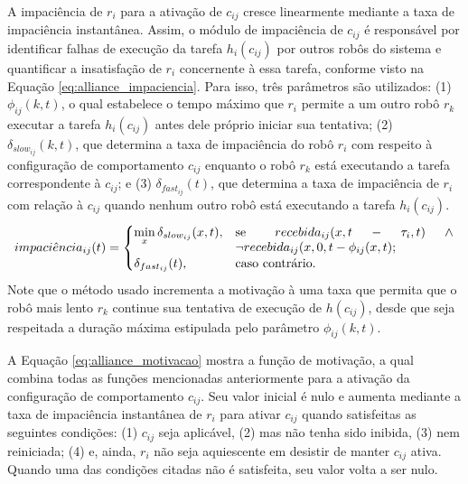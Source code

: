             A impaciência de $r_i$ para a ativação de $c_{ij}$ cresce linearmente mediante a taxa de impaciência instantânea. Assim, o módulo de impaciência de $c_{ij}$ é responsável por identificar falhas de execução da tarefa $h_i(c_{ij})$ por outros robôs do sistema e quantificar a insatisfação de $r_i$ concernente à essa tarefa, conforme visto na Equação \ref{eq:alliance_impaciencia}. Para isso, três parâmetros são utilizados: (1) $\phi_{ij}(k, t)$, o qual estabelece o tempo máximo que $r_i$ permite a um outro robô $r_k$ executar a tarefa $h_i(c_{ij})$ antes dele próprio iniciar sua tentativa; (2) $\delta_{slow_{ij}}(k, t)$, que determina a taxa de impaciência do robô $r_i$ com respeito à configuração de comportamento $c_{ij}$ enquanto o robô $r_k$ está executando a tarefa correspondente à $c_{ij}$; e (3) $\delta_{fast_{ij}}(t)$, que determina a taxa de impaciência de $r_i$ com relação à $c_{ij}$ quando nenhum outro robô está executando a tarefa $h_i(c_{ij})$.
            \begin{equation} \label{eq:alliance_impaciencia}
                impaci\hat{e}ncia_{ij}(t) =
                \begin{cases}
                    \min\limits_{x}\delta_{slow_{ij}}(x, t), & \parbox[t]{.5\textwidth}{se $recebida_{ij}(x, t - \tau_i, t) \land \lnot recebida_{ij}(x, 0, t - \phi_{ij}(x, t)$;} \\
                    \delta_{fast_{ij}}(t), & \text{caso contrário.}
                \end{cases}
            \end{equation}
            Note que o método usado incrementa a motivação à uma taxa que permita que o robô mais lento $r_k$ continue sua tentativa de execução de $h(c_{ij})$, desde que seja respeitada a duração máxima estipulada pelo parâmetro $\phi_{ij}(k, t)$.
            
            A Equação \ref{eq:alliance_motivacao} mostra a função de motivação, a qual combina todas as funções mencionadas anteriormente para a ativação da configuração de comportamento $c_{ij}$. Seu valor inicial é nulo e aumenta mediante a taxa de impaciência instantânea de $r_i$ para ativar $c_{ij}$ quando satisfeitas as seguintes condições: (1) $c_{ij}$ seja aplicável, (2) mas não tenha sido inibida, (3) nem reiniciada; (4) e, ainda, $r_i$ não seja aquiescente em desistir de manter $c_{ij}$ ativa. Quando uma das condições citadas não é satisfeita, seu valor volta a ser nulo. 
            

